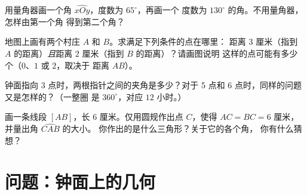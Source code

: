 \begin{exercise}[$\star$]\label{exo:g6:lines:9}
用量角器画一个角 $\widehat{xOy}$，度数为 $65^\circ$，再画一个
度数为 $130^\circ$ 的角。不用量角器，怎样由第一个角
得到第二个角？
\end{exercise}

\begin{exercise}[$\star\star$]\label{exo:g6:lines:10}
地图上画有两个村庄 $A$ 和 $B$。求满足下列条件的点在哪里：
距离 $3$ 厘米（指到 $A$ 的距离）\emph{且}距离 $2$ 厘米（指到 $B$ 的距离）？请画图说明
这样的点可能有多少个（$0$、$1$ 或 $2$，取决于
距离 $AB$）。
\end{exercise}

\begin{exercise}[$\star\star$]\label{exo:g6:lines:11}
钟面指向 3 点时，两根指针之间的夹角是多少？对于 5 点和
6 点时，同样的问题又是怎样的？（一整圈
是 $360^\circ$，对应 $12$ 小时。）
\end{exercise}

\begin{exercise}[$\star\star\star$]\label{exo:g6:lines:12}
画一条线段 $[AB]$，长 $6$ 厘米。仅用圆规作出点 $C$，使得
$AC = BC = 6$ 厘米，并量出角 $\widehat{CAB}$ 的大小。
你作出的是什么三角形？关于它的各个角，
你有什么猜想？
\end{exercise}

\section{问题：钟面上的几何}

